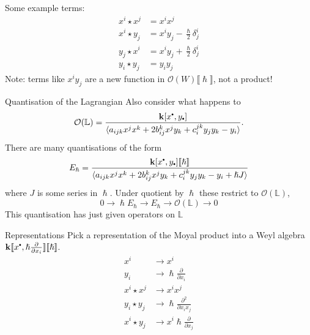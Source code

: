     \begin{frame}
    Some example terms:
    \begin{align*}
         x^i \star x^j &= x^i x^j \\
         x^i \star y_j &= x^i y_j - \frac{\hslash}{2} \delta_{j}^i\\ 
         y_j \star x^i &= x^i y_j + \frac{\hslash}{2} \delta_{j}^i \\ 
         y_i \star y_j &= y_i y_j
    \end{align*}
    Note:  terms like \(x^i y_j\) are a new function in \(\mathcal{O}(W)\lBrack \hslash \rBrack\), not a product! 

    \end{frame}



    \begin{frame}{Quantisation of the Lagrangian}
    Also consider what happens to
    \[ \mathcal{O}(\mathbb{L}) = \frac{ \mathbf{k}[ x^{\sbt}, y_{\sbt} ]}{\langle a_{ijk} x^j x^k + 2 b_{ij}^k x^j y_k + c_i^{jk} y_j y_k - y_i \rangle }.\] 
    There are many quantisations of the form 
    \[  E_{\hslash} = \frac{ \mathbf{k}[ x^{\sbt}, y_{\sbt} ] \lBrack \hslash \rBrack }{\langle a_{ijk} x^j x^k + 2 b_{ij}^k x^j y_k + c_i^{jk} y_j y_k - y_i + \hslash J \rangle }\]
    where \(J\) is some series in \(\hslash\). Under quotient by \(\hslash\) these restrict to \( \mathcal{O}( \mathbb{L})\),
    \[ 0 \rightarrow \hslash E_{\hslash} \rightarrow E_{\hslash} \rightarrow \mathcal{O}( \mathbb{L}) \rightarrow 0 \]
    This quantisation has just given operators on \( \mathbb{L}\)
    \end{frame}


    \begin{frame}{Representations}
        Pick a representation of the Moyal product into a Weyl algebra \( \mathbf{k} \lBrack x^{\sbt}, \hslash \frac{\partial}{\partial x_i} \rBrack \lBrack \hslash \rBrack \).
        \begin{align*}
        x^i & \rightarrow x^i \\
         y_i & \rightarrow \hslash \frac{\partial}{\partial x_i} \\
         x^i \star x^j & \rightarrow x^i x^j  \\
         y_i \star y_j & \rightarrow \hslash \frac{\partial^2 }{\partial x_i x_j} \\
         x^i \star y_j &\rightarrow x^i \hslash \frac{ \partial}{\partial x_j}
        \end{align*}
    \end{frame}
    
